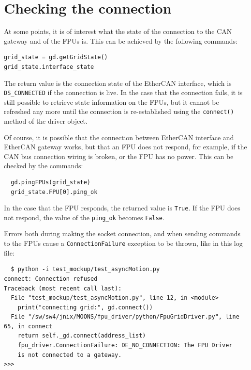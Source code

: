 \documentclass[fontsize=12,a4paper]{scrreprt}
\begin{document}
\section{Checking the connection}
\begin{samepage}
At some points, it is of interest what the state of
the connection to the CAN gateway and of the FPUs is.
This can be achieved by the following commands:
\begin{verbatim}
grid_state = gd.getGridState()
grid_state.interface_state
\end{verbatim}
The return value is the connection state of the EtherCAN interface, which is
\texttt{DS\_CONNECTED} if the connection is live.  In the case that the
connection fails, it is still possible to retrieve state information
on the FPUs, but it cannot be refreshed any more until the connection
is re-established using the \texttt{connect()} method of the driver
object.
\end{samepage}

 Of course, it is possible that the
connection between EtherCAN interface and EtherCAN gateway works, but that an FPU
does not respond, for example, if the CAN bus connection wiring is
broken, or the FPU has no power. This can be checked by the commands:

\begin{verbatim}
  gd.pingFPUs(grid_state)
  grid_state.FPU[0].ping_ok
\end{verbatim}

In the case that the FPU responds, the returned value is
\texttt{True}.  If the FPU does not respond, the value of the
\verb+ping_ok+ becomes \texttt{False}.

Errors both during making the socket connection, and when sending
commands to the FPUs cause a \texttt{ConnectionFailure} exception to
be thrown, like in this log file:

\begin{verbatim}
  $ python -i test_mockup/test_asyncMotion.py
connect: Connection refused
Traceback (most recent call last):
  File "test_mockup/test_asyncMotion.py", line 12, in <module>
    print("connecting grid:", gd.connect())
  File "/sw/sw4/jnix/MOONS/fpu_driver/python/FpuGridDriver.py", line 65, in connect
    return self._gd.connect(address_list)
    fpu_driver.ConnectionFailure: DE_NO_CONNECTION: The FPU Driver
    is not connected to a gateway.
>>>
\end{verbatim}
\end{document}
